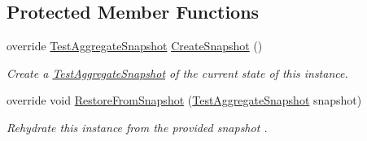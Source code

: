 \subsection*{Protected Member Functions}
\begin{DoxyCompactItemize}
\item 
override \hyperlink{classCqrs_1_1Tests_1_1Integrations_1_1SnapshotTests_1_1TestAggregateSnapshot}{Test\+Aggregate\+Snapshot} \hyperlink{classCqrs_1_1Tests_1_1Integrations_1_1SnapshotTests_1_1TestAggregate_a3857c57a4e603c8d53103caf5f3275d3_a3857c57a4e603c8d53103caf5f3275d3}{Create\+Snapshot} ()
\begin{DoxyCompactList}\small\item\em Create a \hyperlink{classCqrs_1_1Tests_1_1Integrations_1_1SnapshotTests_1_1TestAggregateSnapshot}{Test\+Aggregate\+Snapshot} of the current state of this instance. \end{DoxyCompactList}\item 
override void \hyperlink{classCqrs_1_1Tests_1_1Integrations_1_1SnapshotTests_1_1TestAggregate_ae4109412037b8ec13755d2fa48fa99ab_ae4109412037b8ec13755d2fa48fa99ab}{Restore\+From\+Snapshot} (\hyperlink{classCqrs_1_1Tests_1_1Integrations_1_1SnapshotTests_1_1TestAggregateSnapshot}{Test\+Aggregate\+Snapshot} snapshot)
\begin{DoxyCompactList}\small\item\em Rehydrate this instance from the provided {\itshape snapshot} . \end{DoxyCompactList}\end{DoxyCompactItemize}
